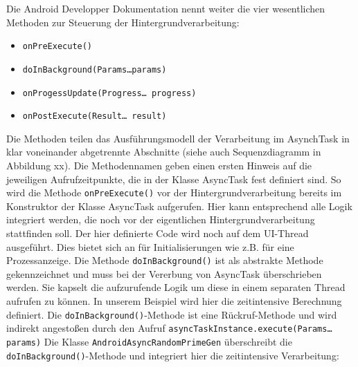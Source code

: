 \documentclass[12pt,oneside,a4paper,bibtotoc,liststotoc]{scrreprt}
\begin{document}
Die Android Developper Dokumentation nennt weiter die vier wesentlichen Methoden zur Steuerung der Hintergrundverarbeitung:
\begin{itemize}
\item \texttt{onPreExecute()}
\item \texttt{doInBackground(Params…params)}
\item \texttt{onProgessUpdate(Progress… progress)}
\item \texttt{onPostExecute(Result… result)}
\end{itemize}
Die Methoden teilen das Ausführungsmodell der Verarbeitung im AsynchTask in klar voneinander abgetrennte Abschnitte (siehe auch Sequenzdiagramm in Abbildung xx). Die Methodennamen geben einen ersten Hinweis auf die jeweiligen Aufrufzeitpunkte, die in der Klasse AsyncTask fest definiert sind. So wird die Methode\newline \newline
\texttt{onPreExecute()}\newline
vor der Hintergrundverarbeitung bereits im Konstruktor der Klasse AsyncTask aufgerufen. Hier kann entsprechend alle Logik integriert werden, die noch vor der eigentlichen Hintergrundverarbeitung stattfinden soll. Der hier definierte Code wird noch auf dem UI-Thread ausgeführt. Dies bietet sich an für Initialisierungen wie z.B. für eine Prozessanzeige.\newline
Die Methode\newline \newline
\texttt{doInBackground()}\newline\newline
ist als abstrakte Methode gekennzeichnet und muss bei der Vererbung von AsyncTask überschrieben werden. Sie kapselt die aufzurufende Logik um diese in einem separaten Thread aufrufen zu können. In unserem Beispiel wird hier die zeitintensive Berechnung definiert. Die \texttt{doInBackground()}-Methode ist eine Rückruf-Methode und wird indirekt angestoßen durch den Aufruf\newline \newline
\texttt{asyncTaskInstance.execute(Params…params)}\newline
Die Klasse \texttt{AndroidAsyncRandomPrimeGen} überschreibt die \texttt{doInBackground()}-Methode und integriert hier die zeitintensive Verarbeitung:
\end{document}

